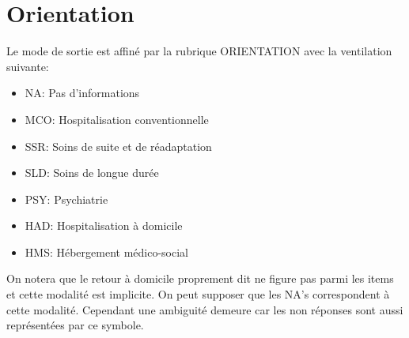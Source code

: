 \documentclass[12pt,english,french,twoside]{book}\usepackage[]{graphicx}\usepackage[]{color}
\begin{document}
\section{Orientation}

Le mode de sortie est affiné par la rubrique ORIENTATION avec la ventilation suivante:

\begin{itemize}
  \item NA:    Pas d'informations
  \item MCO:		Hospitalisation conventionnelle
  \item SSR:		Soins de suite et de réadaptation
  \item SLD:		Soins de longue durée
  \item PSY: 		Psychiatrie
  \item HAD:		Hospitalisation à domicile
  \item HMS:		Hébergement médico-social
\end{itemize}

On notera que le retour à domicile proprement dit ne figure pas parmi les items et cette modalité est implicite. On peut supposer que les NA's correspondent à cette modalité. Cependant une ambiguité demeure car les non réponses sont aussi représentées par ce symbole.
\end{document}
